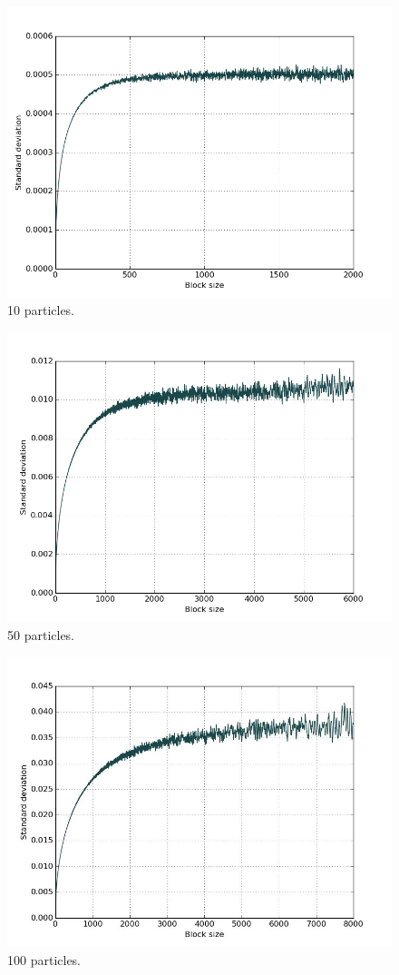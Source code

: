 \documentclass[english, a4paper]{article}
\begin{document}
\begin{figure}[H]
	\centering
	\includegraphics[width=0.7\linewidth]{../modifiedMortenCode/figures/N=10_D=3_alpha=0498783_steps=1e6_full.png}
	\caption{10 particles.}
	\label{fig:blocking_full}
\end{figure}

\begin{figure}[H]
	\centering
	\includegraphics[width=0.7\linewidth]{../modifiedMortenCode/figures/N=50_D=3_alpha=0498783_steps=1e6_full_1.png}
	\caption{50 particles.}
	\label{fig:blocking_full2}
\end{figure}

\begin{figure}[H]
	\centering
	\includegraphics[width=0.7\linewidth]{../modifiedMortenCode/figures/N=100_D=3_alpha=0498783_steps=1e6_full_1.jpg}
	\caption{100 particles.}
	\label{fig:blocking_full3}
\end{figure}
\end{document}
